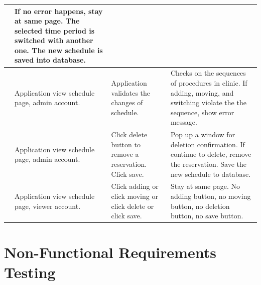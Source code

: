 \documentclass[12pt]{article}
\newcounter{TestCounter}
\begin{document}
\begin{center}
\begin{longtable}{c>{\raggedright\arraybackslash}p{4.8cm} >{\raggedright\arraybackslash}p{3cm}>{\raggedright\arraybackslash}p{3cm}}
		& If no error happens, stay at same page. The selected time period  is switched with another one. The new schedule is saved into database.
		\\\midrule
		\stepcounter{TestCounter}\arabic{TestCounter} 
		& Application view schedule page, admin account.
		& Application validates the changes of schedule.
		& Checks on the sequences of procedures in clinic. If adding, moving, and switching violate the the sequence, show error message.
		\\\midrule
		\stepcounter{TestCounter}\arabic{TestCounter} 
		& Application view schedule page, admin account.
		& Click delete button to remove a reservation. Click save. 
		& Pop up a window for deletion confirmation. If continue to delete, remove the reservation. Save the new schedule to database. 
		\\\midrule
		\stepcounter{TestCounter}\arabic{TestCounter} 
		& Application view schedule page, viewer account.
		& Click adding or  click moving or click delete or click save.
		& Stay at same page. No adding button, no moving button, no deletion button, no save button.
		\\\midrule
		\bottomrule
	\end{longtable}
\end{center}


\section{Non-Functional Requirements Testing}
\end{document}
